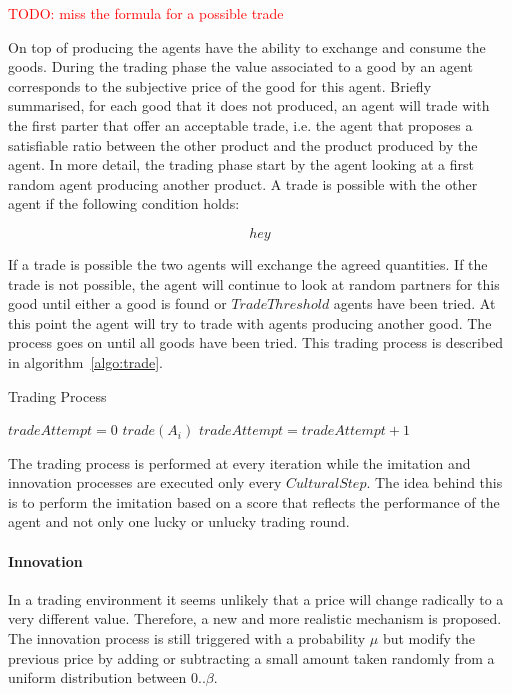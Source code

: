 \documentclass{wscpaperproc}
\newcommand{\memo}[2]{\textcolor{#1}{#2}}
\newcommand{\todo}[1]{\memo{red}{TODO: #1\\}}
\begin{document}
\todo{miss the formula for a possible trade}

On top of producing the agents have the ability to exchange and consume the goods. During the trading phase the value associated to a good by an agent corresponds to the subjective price of the good for this agent. Briefly summarised, for each good that it does not produced, an agent will trade with the first parter that offer an acceptable trade, i.e. the agent that proposes a satisfiable ratio between the other product and the product produced by the agent. In more detail, the trading phase start by the agent looking at a first random agent producing another product. A trade is possible with the other agent if the following condition holds:

$$ hey $$

If a trade is possible the two agents will exchange the agreed quantities. If the trade is not possible, the agent will continue to look at random partners for this good until either a good is found or $TradeThreshold$ agents have been tried. At this point the agent will try to trade with agents producing another good. The process goes on until all goods have been tried. This trading process is described in algorithm~\ref{algo:trade}.

\begin{algorithm}
\caption{Trading Process}
\label{algo:trade}
	\begin{algorithmic}[1]
	\scriptsize
			\State $tradeAttempt = 0$
					\State $trade(A_i)$
				\Else
					\State $tradeAttempt = tradeAttempt + 1$					
				\EndIf
			\EndFor
		\EndFor
\end{algorithmic}
\end{algorithm}

The trading process is performed at every iteration while the imitation and innovation processes are executed only every $CulturalStep$. The idea behind this is to perform the imitation based on a score that reflects the performance of the agent and not only one lucky or unlucky trading round.

\paragraph{Innovation} In a trading environment it seems unlikely that a price will change radically to a very different value. Therefore, a new and more realistic mechanism is proposed. The innovation process is still triggered with a probability $\mu$ 
but modify the previous price by adding or subtracting a small amount taken randomly from a uniform  distribution between $0 .. \beta$.
\end{document}
